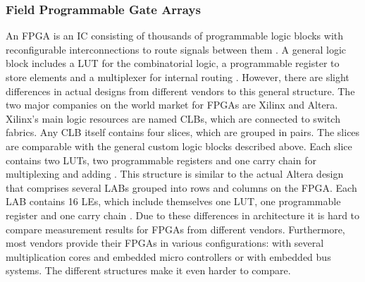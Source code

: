 \subsubsection{Field Programmable Gate Arrays}
An \ac{FPGA} is an \ac{IC} consisting of thousands of programmable logic blocks with reconfigurable interconnections to route signals between them \cite{Rec_Comp}. A general logic block includes a \ac{LUT} for the combinatorial logic, a programmable register to store elements and a multiplexer for internal routing \cite{FPGA_CPLD}. However, there are slight differences in actual designs from different vendors to this general structure. The two major companies on the world market for \acp{FPGA} are Xilinx and Altera. Xilinx's main logic resources are named \acp{CLB}, which are connected to switch fabrics. Any \ac{CLB} itself contains four slices, which are grouped in pairs. The slices are comparable with the general custom logic blocks described above. Each slice contains two \acp{LUT}, two programmable registers and one carry chain for multiplexing and adding \cite{virtex4}. This structure is similar to the actual Altera design that comprises several \acp{LAB} grouped into rows and columns on the \ac{FPGA}. Each \ac{LAB} contains 16 \acp{LE}, which include themselves one \ac{LUT}, one programmable register and one carry chain \cite{cyclone2}. Due to these differences in architecture it is hard to compare measurement results for \acp{FPGA} from different vendors. Furthermore, most vendors provide their \acp{FPGA} in various configurations: with several multiplication cores and embedded micro controllers or with embedded bus systems. The different structures make it even harder to compare.  


